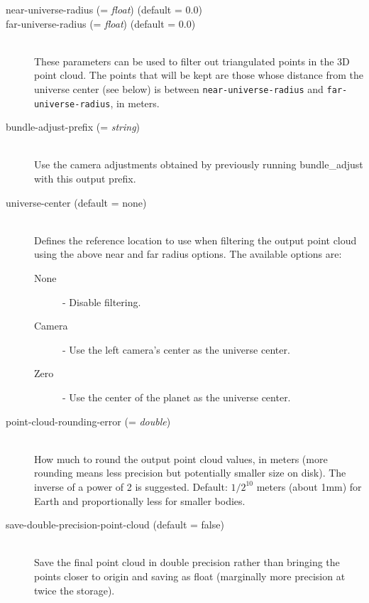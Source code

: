 \begin{description}
\item[near-universe-radius \textnormal{\small{(= \emph{float})}} (default = 0.0)]
\item[far-universe-radius \textnormal{\small{(= \emph{float})}} (default = 0.0)] \hfill \\

These parameters can be used to filter out triangulated points in
the 3D point cloud. The points that will be kept are those
whose distance from the universe center (see below) is between
\texttt{near-universe-radius} and \texttt{far-universe-radius}, in meters.

\item[bundle-adjust-prefix \textnormal{\small{(= \emph{string})}}] \hfill \\ Use the camera adjustments obtained by previously running bundle\_adjust with this output prefix.

\item[universe-center \textnormal (default = none)] \hfill \\
Defines the reference location to use when filtering the output point cloud
using the above near and far radius options. The available options
are:

  \begin{description}
    \item[None] - Disable filtering.
    \item[Camera] - Use the left camera's center as the universe center.
    \item[Zero]   - Use the center of the planet as the universe center.
  \end{description}

\item[point-cloud-rounding-error \textnormal{\small{(= \emph{double})}}] \hfill \\

How much to round the output point cloud values, in meters (more
rounding means less precision but potentially smaller size on disk). The
inverse of a power of 2 is suggested. Default: $1/2^{10}$ meters (about 1mm) for Earth and
proportionally less for smaller bodies.

\item[save-double-precision-point-cloud \textnormal (default = false)] \hfill \\

Save the final point cloud in double precision rather than bringing the
points closer to origin and saving as float (marginally more precision
at twice the storage).


\end{description}
